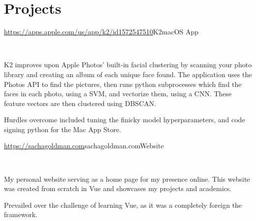 \documentclass[]{style}
\begin{document}
\section{Projects}

\begin{entrylist}

\vspace{2mm}

\entry
{\url{https://apps.apple.com/us/app/k2/id1572547510}{K2}}{macOS App}
{ ~ \vspace{-2.5mm}

  

K2 improves upon Apple Photos' built-in facial clustering by scanning your photo library and creating an album of each unique face found. The application uses the Photos API to find the pictures, then runs python subprocesses which find the faces in each photo, using a SVM, and vectorize them, using a CNN. These feature vectors are then clustered using DBSCAN.
\vspace{1mm}

Hurdles overcome included tuning the finicky model hyperparameters, and code signing python for the Mac App Store.}

\vspace{2mm}

\entry
{\url{https://sachagoldman.com}{sachagoldman.com}}{Website}
{ ~ \vspace{-2.5mm}

 

My personal website serving as a home page for my presence online. This website was created from scratch in Vue and showcases my projects and academics. 
\vspace{1mm}

Prevailed over the challenge of learning Vue, as it was a completely foreign the framework.}

\end{entrylist}
\end{document}
